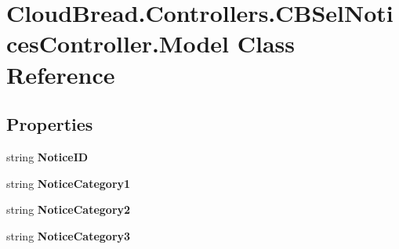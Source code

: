 \hypertarget{class_cloud_bread_1_1_controllers_1_1_c_b_sel_notices_controller_1_1_model}{}\section{Cloud\+Bread.\+Controllers.\+C\+B\+Sel\+Notices\+Controller.\+Model Class Reference}
\label{class_cloud_bread_1_1_controllers_1_1_c_b_sel_notices_controller_1_1_model}
\subsection*{Properties}
\begin{DoxyCompactItemize}
\item 
string {\bfseries Notice\+ID}\hypertarget{class_cloud_bread_1_1_controllers_1_1_c_b_sel_notices_controller_1_1_model_ad8cfa04c811d27cc8c64ad9e232a4180}{}\label{class_cloud_bread_1_1_controllers_1_1_c_b_sel_notices_controller_1_1_model_ad8cfa04c811d27cc8c64ad9e232a4180}

\item 
string {\bfseries Notice\+Category1}\hypertarget{class_cloud_bread_1_1_controllers_1_1_c_b_sel_notices_controller_1_1_model_a7d86d47577dee027d36f9ae393aec550}{}\label{class_cloud_bread_1_1_controllers_1_1_c_b_sel_notices_controller_1_1_model_a7d86d47577dee027d36f9ae393aec550}

\item 
string {\bfseries Notice\+Category2}\hypertarget{class_cloud_bread_1_1_controllers_1_1_c_b_sel_notices_controller_1_1_model_a1572d8011d4b7f1599db196f44b5bf6f}{}\label{class_cloud_bread_1_1_controllers_1_1_c_b_sel_notices_controller_1_1_model_a1572d8011d4b7f1599db196f44b5bf6f}

\item 
string {\bfseries Notice\+Category3}\hypertarget{class_cloud_bread_1_1_controllers_1_1_c_b_sel_notices_controller_1_1_model_afe8b0fa55a184a11a261470536abade3}{}\label{class_cloud_bread_1_1_controllers_1_1_c_b_sel_notices_controller_1_1_model_afe8b0fa55a184a11a261470536abade3}


\end{DoxyCompactItemize}
